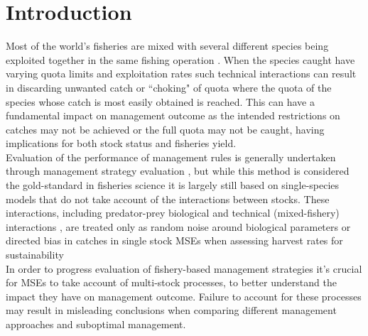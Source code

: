 \documentclass[12pt, halfline, a4paper]{ouparticle}
\begin{document}
\date{\today}


\maketitle

\section{Introduction}
\label{intro}

Most of the world's fisheries are mixed with several different species being
exploited together in the same fishing operation \citep{Ulrich2012a}. When the
species caught have varying quota limits and exploitation rates such technical
interactions can result in discarding unwanted catch or ``choking" of quota
where the quota of the species whose catch is most easily obtained is reached.
This can have a fundamental impact on management outcome as the intended
restrictions on catches may not be achieved or the full quota may not be
caught, having implications for both stock status and fisheries yield. \\

Evaluation of the performance of management rules is generally undertaken
through management strategy evaluation \citep[MSE,][]{Punt2014}, but while this
method is considered the gold-standard in fisheries science it is largely still
based on single-species models that do not take account of the interactions
between stocks. These interactions, including predator-prey biological
\citep{Thorpe2016} and technical (mixed-fishery) interactions
\citep{Ulrich2001}, are treated only as random noise around biological
parameters or directed bias in catches in single stock MSEs when assessing
harvest rates for sustainability \citep[known in MSE frameworks as
``implementation error",][]{Sethi2005, Dichmont2006} \\

In order to progress evaluation of fishery-based management strategies it's
crucial for MSEs to take account of multi-stock processes, to better understand
the impact they have on management outcome. Failure to account for these
processes may result in misleading conclusions when comparing different
management approaches and suboptimal management. \\
\end{document}
